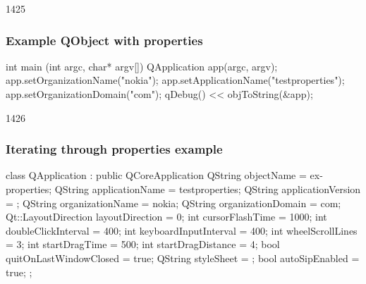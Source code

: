 \begin{slide}[fragile]{1425}
\frametitle{Example QObject with properties}
\begin{cpp}
int main (int argc, char* argv[]) {
    QApplication app(argc, argv);
    app.setOrganizationName("nokia");
    app.setApplicationName("testproperties");
    app.setOrganizationDomain("com");
    qDebug() << objToString(&app);
}
\end{cpp}
\end{slide}

\begin{slide}[fragile]{1426}
\frametitle{Iterating through properties example}
\begin{cpp}
class QApplication : public QCoreApplication {
  QString objectName = ex-properties;
  QString applicationName = testproperties;
  QString applicationVersion = ;
  QString organizationName = nokia;
  QString organizationDomain = com;
  Qt::LayoutDirection layoutDirection = 0;
  int cursorFlashTime = 1000;
  int doubleClickInterval = 400;
  int keyboardInputInterval = 400;
  int wheelScrollLines = 3;
  int startDragTime = 500;
  int startDragDistance = 4;
  bool quitOnLastWindowClosed = true;
  QString styleSheet = ;
  bool autoSipEnabled = true;
};
\end{cpp}
\end{slide}

